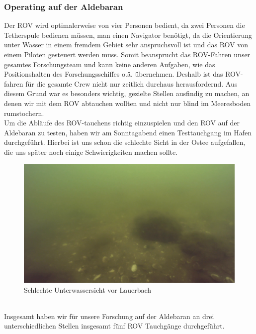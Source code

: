 \subsubsection{Operating auf der Aldebaran}
Der ROV wird optimalerweise 
von vier Personen bedient, da zwei Personen die Tetherspule bedienen müssen, man einen Navigator benötigt, da die Orientierung unter Wasser in einem fremdem Gebiet sehr anspruchsvoll ist und das ROV von einem Piloten gesteuert werden muss.
Somit beansprucht das ROV-Fahren unser gesamtes Forschungsteam und kann keine anderen Aufgaben, wie das Positionshalten des Forschungsschiffes o.ä. übernehmen. Deshalb ist das ROV-fahren für die gesamte Crew nicht nur zeitlich durchaus herausfordernd.
Aus diesem Grund war es besonders wichtig, gezielte Stellen ausfindig zu machen, an denen wir mit dem ROV abtauchen wollten und nicht nur blind im Meeresboden rumstochern.
\\

Um die Abläufe des ROV-tauchens richtig einzuspielen und den ROV auf der Aldebaran zu testen, haben wir am Sonntagabend einen Testtauchgang im Hafen durchgeführt. 
Hierbei ist uns schon die schlechte Sicht in der Ostee aufgefallen, die uns später noch einige Schwierigkeiten machen sollte.
\begin{figure}[htb]
\includegraphics[height=\textheight,%
                   width=\textwidth,%
                   keepaspectratio]{Bilder/ROV/Steine.png}
\caption{Schlechte Unterwassersicht vor Lauerbach}
\end{figure}
\\

Insgesamt haben wir für unsere Forschung auf der Aldebaran an drei unterschiedlichen Stellen insgesamt fünf ROV Tauchgänge durchgeführt.
